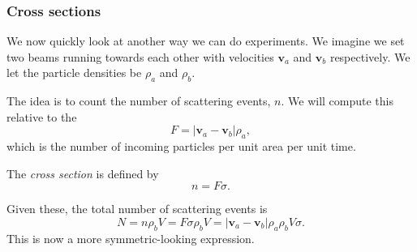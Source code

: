 \documentclass[a4paper]{article}
\begin{document}
%

\subsubsection*{Cross sections}
We now quickly look at another way we can do experiments. We imagine we set two beams running towards each other with velocities $\mathbf{v}_a$ and $\mathbf{v}_b$ respectively. We let the particle densities be $\rho_a$ and $\rho_b$.

The idea is to count the number of scattering events, $n$. We will compute this relative to the 
\[
  F = |\mathbf{v}_a - \mathbf{v}_b| \rho_a,
\]
which is the number of incoming particles per unit area per unit time.
\begin{defi}
  The \emph{cross section}\index{$\sigma$} is defined by
  \[
    n = F \sigma.
  \]
\end{defi}
Given these, the total number of scattering events is
\[
  N = n \rho_b V = F \sigma \rho_b V = |\mathbf{v}_a - \mathbf{v}_b| \rho_a \rho_b V \sigma.
\]
This is now a more symmetric-looking expression.
\end{document}
